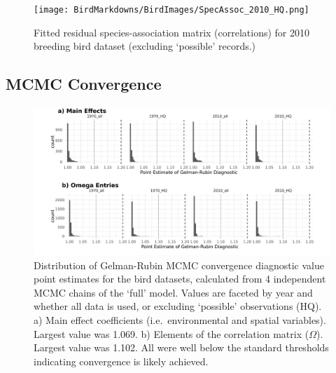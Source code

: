 \documentclass[
]{article}
\begin{document}
\begin{figure}
\centering
\texttt{[image: BirdMarkdowns/BirdImages/SpecAssoc\_2010\_HQ.png]}
\caption{Fitted residual species-association matrix (correlations) for
2010 breeding bird dataset (excluding `possible' records.)}
\end{figure}

\hypertarget{mcmc-convergence}{%
\subsection{MCMC Convergence}\label{mcmc-convergence}}

\begin{figure}
\centering
\includegraphics{BirdMarkdowns/BirdImages/ModelCovergence.png}
\caption{Distribution of Gelman-Rubin MCMC convergence diagnostic value
point estimates for the bird datasets, calculated from 4 independent
MCMC chains of the `full' model. Values are faceted by year and whether
all data is used, or excluding `possible' observations (HQ). a) Main
effect coefficients (i.e.~environmental and spatial variables). Largest
value was 1.069. b) Elements of the correlation matrix (\(\Omega\)).
Largest value was 1.102. All were well below the standard thresholds
indicating convergence is likely achieved.}
\end{figure}
\end{document}
